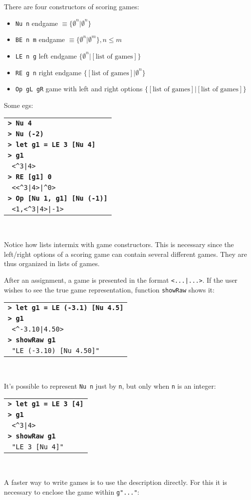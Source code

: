 \documentclass[a4paper,12pt]{article}
\newcommand{\bash}[1]{\small\textbf{\lstinline§> #1§}\\}
\newcommand{\out}[1]{\small\lstinline§ #1§}
\newcommand{\haskellCode}{\fontfamily{pcr}\selectfont}
\newenvironment{sgcode}
	{ \haskellCode
	  \begin{tabular}{|p{0.9\textwidth}|}
      \hline	
	}
	{ \\\hline  
      \end{tabular} \\
	  \par 
	}
\begin{document}
There are four constructors of scoring games:

\begin{itemize} \setlength\itemsep{0.1em}
  \item \verb|Nu n| endgame $\equiv \{ \emptyset^n | \emptyset^n \}$
  \item \verb|BE n m| endgame $\equiv \{ \emptyset^n | \emptyset^m \}, n\leq m$
  \item \verb|LE n g| left endgame $\{ \emptyset^n | [\text{list of games}] \}$
  \item \verb|RE g n| right endgame $\{ [\text{list of games}] | \emptyset^n \}$
  \item \verb|Op gL gR| game with left and right options $\{ [\text{list of games}] | [\text{list of games}] \}$
\end{itemize}

Some egs:

\begin{sgcode}
\bash{Nu 4}
\bash{Nu (-2)}
\bash{let g1 = LE 3 [Nu 4]}
\bash{g1}
\out{<^3|4>} \\
\bash{RE [g1] 0}
\out{<<^3|4>|^0>} \\
\bash{Op [Nu 1, g1] [Nu (-1)]}
\out{<1,<^3|4>|-1>}
\end{sgcode}

Notice how lists intermix with game constructors. This is necessary since the left/right options
of a scoring game can contain several different games. They are thus organized in lists of games.

After an assignment, a game is presented in the format \verb!<...|...>!. If the user wishes to 
see the true game representation, function \verb|showRaw| shows it:

\begin{sgcode}
\bash{let g1 = LE (-3.1) [Nu 4.5]}
\bash{g1}
\out{<^-3.10|4.50>} \\
\bash{showRaw g1}
\out{"LE (-3.10) [Nu 4.50]"}
\end{sgcode}

It's possible to represent \verb|Nu n| just by \verb|n|, but only when \verb|n| is an integer:

\begin{sgcode}
\bash{let g1 = LE 3 [4]}
\bash{g1}
\out{<^3|4>} \\
\bash{showRaw g1}
\out{"LE 3 [Nu 4]"}
\end{sgcode}

A faster way to write games is to use the description directly. For this it is necessary
to enclose the game within \verb|g"..."|:
\end{document}
